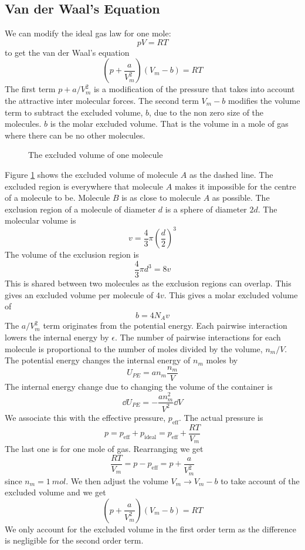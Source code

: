 \documentclass{article}
\begin{document}
    \subsection{Van der Waal's Equation}
    We can modify the ideal gas law for one mole:
    \[pV = RT\]
    to get the van der Waal's equation
    \[(p + \frac{a}{V_m^2})(V_m - b) = RT\]
    The first term \(p + a/V_m^2\) is a modification of the pressure that takes into account the attractive inter molecular forces.
    The second term \(V_m - b\) modifies the volume term to subtract the excluded volume, \(b\), due to the non zero size of the molecules.
    \(b\) is the molar excluded volume.
    That is the volume in a mole of gas where there can be no other molecules.
    \begin{figure}[ht]
        \centering
        \caption{The excluded volume of one molecule}
        \label{fig:excluded volume}
    \end{figure}
    Figure \ref{fig:excluded volume} shows the excluded volume of molecule \(A\) as the dashed line.
    The excluded region is everywhere that molecule \(A\) makes it impossible for the centre of a molecule to be.
    Molecule \(B\) is as close to molecule \(A\) as possible.
    The exclusion region of a molecule of diameter \(d\) is a sphere of diameter \(2d\).
    The molecular volume is
    \[v = \frac{4}{3}\pi\left(\frac{d}{2}\right)^3\]
    The volume of the exclusion region is
    \[\frac{4}{3}\pi d^3 = 8v\]
    This is shared between two molecules as the exclusion regions can overlap.
    This gives an excluded volume per molecule of \(4v\).
    This gives a molar excluded volume of
    \[b = 4N_Av\]
    The \(a/V_m^2\) term originates from the potential energy.
    Each pairwise interaction lowers the internal energy by \(\epsilon\).
    The number of pairwise interactions for each molecule is proportional to the number of moles divided by the volume, \(n_m/V\).
    The potential energy changes the internal energy of \(n_m\) moles by
    \[U_{PE} = an_m\frac{n_m}{V}\]
    The internal energy change due to changing the volume of the container is
    \[\dd U_{PE} = -\frac{an_m^2}{V^2}\dd V\]
    We associate this with the effective pressure, \(p_\text{eff}\).
    The actual pressure is
    \[p = p_\text{eff} + p_\text{ideal} = p_\text{eff} + \frac{RT}{V_m}\]
    The last one is for one mole of gas.
    Rearranging we get
    \[\frac{RT}{V_m} = p - p_\text{eff} = p + \frac{a}{V_m^2}\]
    since \(n_m = \SI{1}{mol}\).
    We then adjust the volume \(V_m\to V_m - b\) to take account of the excluded volume and we get
    \[\left(p + \frac{a}{V_m^2}\right)(V_m - b) = RT\]
    We only account for the excluded volume in the first order term as the difference is negligible for the second order term.
    
\end{document}
